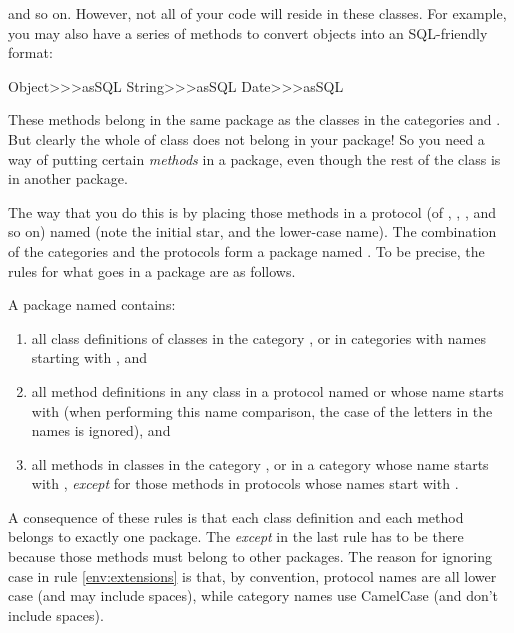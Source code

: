 \documentclass[a4paper,10pt,twoside]{book}
\begin{document}
\vspace{1ex}
\noindent
and so on. However, not all of your code will reside in these classes. For example, you may also have a series of methods to convert objects into an SQL-friendly format:

\begin{code}{}
Object>>>asSQL
String>>>asSQL
Date>>>asSQL
\end{code}

\noindent
These methods belong in  the same package as the classes in the 
categories  and . 
But clearly the whole of class  does not belong in your package! 
So you need a way of putting certain \emph{methods} in a package, even though the rest of the class is in another package.

The way that you do this is by placing those methods in a protocol (of , , , and so on) named  (note the initial star, and the lower-case name). The combination of the  categories and the  protocols form a package named .
To be precise, the rules for what goes in a package are as follows.

A package named  contains:

\begin{enumerate}		\label{sec:packageRules}
	\item{} all class definitions of classes in the category , or in categories with names starting with , and
	\item{} \label{env:extensions} all method definitions in any class in a protocol named  or whose name starts with  (when performing this name comparison, the case of the letters in the names is ignored), and
	\item{} all methods in classes in the category , or in a category whose name starts with , \emph{except} for those methods in protocols whose names start with \prot{*}.
	
\end{enumerate}
\noindent
A consequence of these rules is that each class definition and each method belongs to exactly one package. The \emph{except} in the last rule has to be there because those methods must belong to other packages.   The reason for ignoring case in rule \ref{env:extensions} is that, by convention, protocol names are all lower case (and may include spaces), while category names use CamelCase (and don't include spaces).
\end{document}
